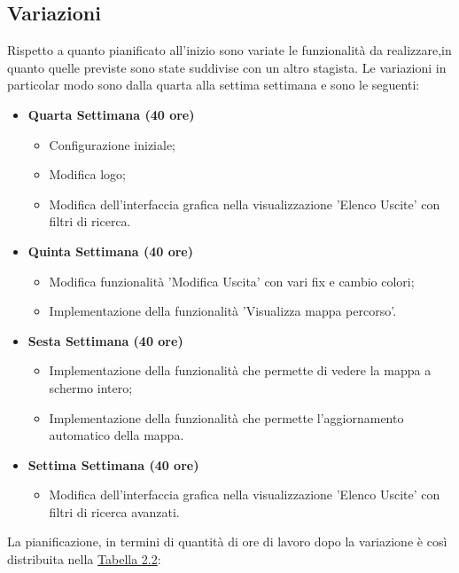 \subsection{Variazioni}
Rispetto a quanto pianificato all'inizio sono variate le funzionalità da realizzare,in quanto quelle previste sono state suddivise con un altro stagista.
Le variazioni in particolar modo sono dalla quarta alla settima settimana e sono le seguenti:
\begin{itemize}
\item \textbf{Quarta Settimana (40 ore)} 
\begin{itemize}
	\item Configurazione iniziale;
	\item Modifica logo;
	\item Modifica dell'interfaccia grafica nella visualizzazione 'Elenco Uscite' con filtri di ricerca.
\end{itemize}
\item \textbf{Quinta Settimana (40 ore)} 
\begin{itemize}
	\item Modifica funzionalità 'Modifica Uscita' con vari fix e cambio colori;
	\item Implementazione della funzionalità 'Visualizza mappa percorso'.
\end{itemize}
\item \textbf{Sesta Settimana (40 ore)} 
\begin{itemize}
	\item Implementazione della funzionalità che permette di vedere la mappa a schermo intero;
	\item Implementazione della funzionalità che permette l'aggiornamento automatico della mappa.
\end{itemize}
\item \textbf{Settima Settimana (40 ore)} 
\begin{itemize}
	\item Modifica dell'interfaccia grafica nella visualizzazione 'Elenco Uscite' con filtri di ricerca avanzati.
\end{itemize}
\end{itemize}
La pianificazione, in termini di quantità di ore di lavoro dopo la variazione è così distribuita nella \hyperref[tab:Tabella riassuntiva della pianificazione di stage con variazioni]{Tabella 2.2}:
